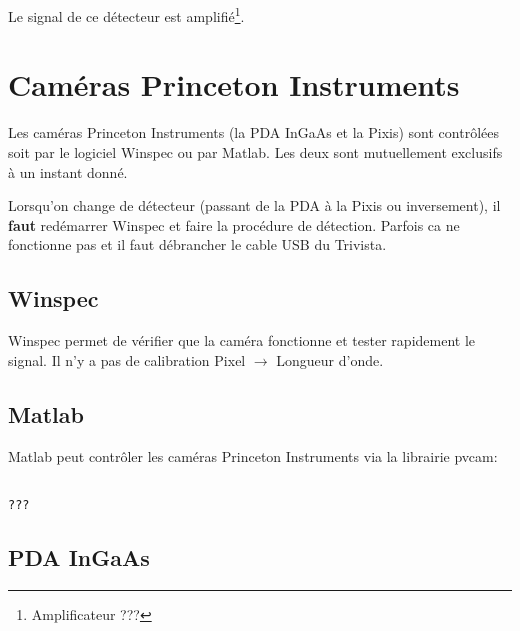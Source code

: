 \documentclass[11pt,francais]{book} %
\begin{document}
Le signal de ce détecteur est amplifié\footnote{Amplificateur ???}.


\section{Caméras Princeton Instruments}

Les caméras Princeton Instruments (la PDA InGaAs et la Pixis) sont contrôlées soit par le logiciel Winspec ou par Matlab.
Les deux sont mutuellement exclusifs à un instant donné.

Lorsqu'on change de détecteur (passant de la PDA à la Pixis ou inversement), il {\bf faut} redémarrer Winspec et faire la procédure de détection.
Parfois ca ne fonctionne pas et il faut débrancher le cable USB du Trivista.

\subsection{Winspec}

Winspec permet de vérifier que la caméra fonctionne et tester rapidement le signal.
Il n'y a pas de calibration Pixel $\rightarrow$ Longueur d'onde.

\subsection{Matlab}

Matlab peut contrôler les caméras Princeton Instruments via la librairie pvcam:
\begin{center}
\end{center}


\begin{lstlisting}[frame=single,caption={Exemple d'utilisation des caméras Princeton Instruments avec Matlab},label={lst:excameraprincetoninstruments},breaklines=true,]  % Start your code-block

???
\end{lstlisting}

\subsection{PDA InGaAs}
\end{document}
